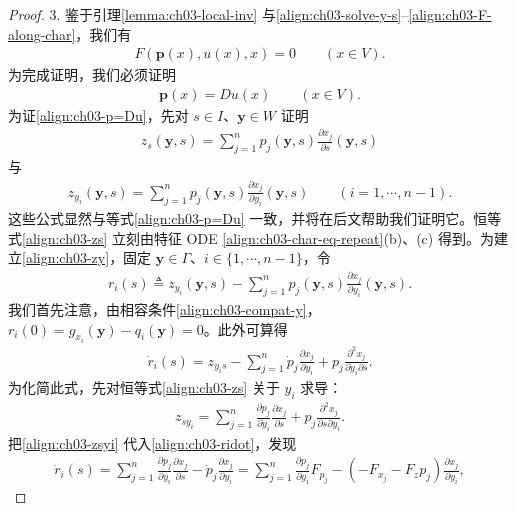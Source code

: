 \documentclass[../../main.tex]{subfiles}
\begin{document}
\begin{proof}
3. 鉴于引理\cref{lemma:ch03-local-inv} 与\eqref{align:ch03-solve-y-s}--\eqref{align:ch03-F-along-char}，我们有
\begin{align*}
F(\mathbf{p}(x),u(x),x)=0 \qquad (x\in V).
\end{align*}
为完成证明，我们必须证明
\begin{align}\label{align:ch03-p=Du}
\mathbf{p}(x)=Du(x) \qquad (x\in V).
\end{align}
为证\eqref{align:ch03-p=Du}，先对 $s\in I$、$\mathbf{y}\in W$ 证明
\begin{align}\label{align:ch03-zs}
z_s(\mathbf{y},s)=\sum_{j=1}^n p_j(\mathbf{y},s)\frac{\partial x_j}{\partial s}(\mathbf{y},s)
\end{align}
与
\begin{align}\label{align:ch03-zy}
z_{y_i}(\mathbf{y},s)=\sum_{j=1}^n p_j(\mathbf{y},s)\frac{\partial x_j}{\partial y_i}(\mathbf{y},s) \qquad (i=1,\cdots,n-1).
\end{align}
这些公式显然与等式\eqref{align:ch03-p=Du} 一致，并将在后文帮助我们证明它。恒等式\eqref{align:ch03-zs} 立刻由特征 ODE \eqref{align:ch03-char-eq-repeat}(b)、(c) 得到。为建立\eqref{align:ch03-zy}，固定 $\mathbf{y}\in\Gamma$、$i\in\{1,\cdots,n-1\}$，令
\begin{align}\label{align:ch03-ri}
r_i(s)\triangleq z_{y_i}(\mathbf{y},s)-\sum_{j=1}^n p_j(\mathbf{y},s)\frac{\partial x_j}{\partial y_i}(\mathbf{y},s).
\end{align}
我们首先注意，由相容条件\eqref{align:ch03-compat-y}，$r_i(0)=g_{x_i}(\mathbf{y})-q_i(\mathbf{y})=0$。此外可算得
\begin{align}\label{align:ch03-ridot}
\dot{r}_i(s)=z_{y_i s}-\sum_{j=1}^n \dot{p}_j\frac{\partial x_j}{\partial y_i}+p_j\frac{\partial^2 x_j}{\partial y_i\partial s}.
\end{align}
为化简此式，先对恒等式\eqref{align:ch03-zs} 关于 $y_i$ 求导：
\begin{align}\label{align:ch03-zsyi}
z_{s y_i}=\sum_{j=1}^n \frac{\partial p_j}{\partial y_i}\frac{\partial x_j}{\partial s}+p_j\frac{\partial^2 x_j}{\partial s\partial y_i}.
\end{align}
把\eqref{align:ch03-zsyi} 代入\eqref{align:ch03-ridot}，发现
\begin{align}\label{align:ch03-ridot2}
\dot{r}_i(s)=\sum_{j=1}^n \frac{\partial p_j}{\partial y_i}\frac{\partial x_j}{\partial s}-\dot{p}_j\frac{\partial x_j}{\partial y_i}
=\sum_{j=1}^n \frac{\partial p_j}{\partial y_i}F_{p_j}-(-F_{x_j}-F_z p_j)\frac{\partial x_j}{\partial y_i},
\end{align}

\end{proof}
\end{document}

